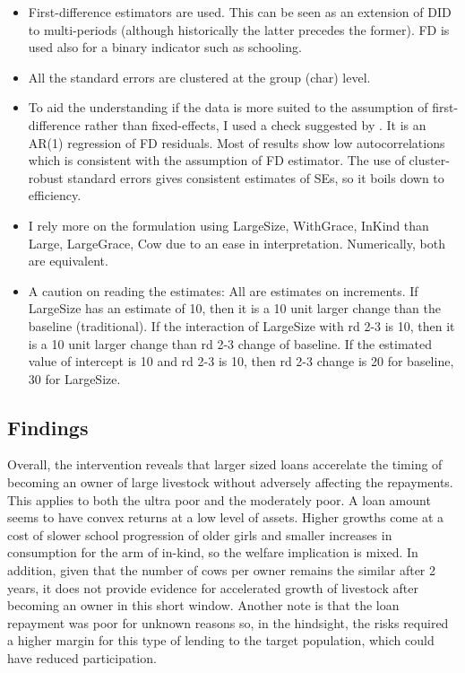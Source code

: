 \begin{itemize}
\vspace{1.0ex}\setlength{\itemsep}{1.0ex}\setlength{\baselineskip}{12pt}
\item	First-difference estimators are used. This can be seen as an extension of DID to multi-periods (although historically the latter precedes the former). FD is used also for a binary indicator such as schooling.
\item	All the standard errors are clustered at the group (char) level.
\item	To aid the understanding if the data is more suited to the assumption of first-difference rather than fixed-effects, I used a check suggested by \citet[][10.71]{Wooldridge2010}. It is an AR(1) regression of FD residuals. Most of results show low autocorrelations which is consistent with the assumption of FD estimator. The use of cluster-robust standard errors gives consistent estimates of SEs, so it boils down to efficiency. 
\item	I rely more on the formulation using \textsf{LargeSize, WithGrace, InKind} than \textsf{Large, LargeGrace, Cow} due to an ease in interpretation. Numerically, both are equivalent.
\item	A caution on reading the estimates: All are estimates on increments. If \textsf{LargeSize} has an estimate of 10, then it is a 10 unit larger change than the baseline (traditional). If the interaction of \textsf{LargeSize} with rd 2-3 is 10, then it is a 10 unit larger change than rd 2-3 change of baseline. If the estimated value of intercept is 10 and rd 2-3 is 10, then rd 2-3 change is 20 for baseline, 30 for \textsf{LargeSize}. 
\end{itemize}

\subsection{Findings}

Overall, the intervention reveals that larger sized loans accerelate the timing of becoming an owner of large livestock without adversely affecting the repayments. This applies to both the ultra poor and the moderately poor. A loan amount seems to have convex returns at a low level of assets. Higher growths come at a cost of slower school progression of older girls and smaller increases in consumption for the arm of in-kind, so the welfare implication is mixed. In addition, given that the number of cows per owner remains the similar after 2 years, it does not provide evidence for accelerated growth of livestock after becoming an owner in this short window. Another note is that the loan repayment was poor for unknown reasons so, in the hindsight, the risks required a higher margin for this type of lending to the target population, which could have reduced participation.

